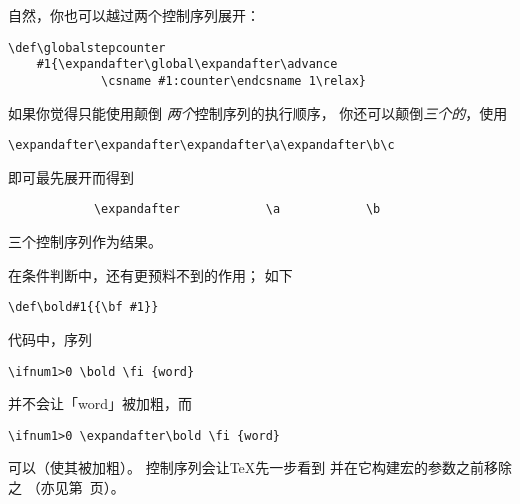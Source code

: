 \documentclass{book}
\begin{document}
自然，你也可以越过两个控制序列展开：
\begin{verbatim}
\def\globalstepcounter
    #1{\expandafter\global\expandafter\advance
             \csname #1:counter\endcsname 1\relax}
\end{verbatim}
如果你觉得只能使用颠倒
{\sl 两个\/}控制序列的执行顺序，
你还可以颠倒{\sl 三个的\/}，使用
\begin{verbatim}
\expandafter\expandafter\expandafter\a\expandafter\b\c 
\end{verbatim}
即可最先展开而得到
\begin{verbatim}
            \expandafter            \a            \b 
\end{verbatim} 
三个控制序列作为结果。

在条件判断中，还有更预料不到的作用；
如下
\begin{verbatim}
\def\bold#1{{\bf #1}}
\end{verbatim}
代码中，序列
\begin{verbatim}
\ifnum1>0 \bold \fi {word}
\end{verbatim}
并不会让「word」被加粗，而
\begin{verbatim}
\ifnum1>0 \expandafter\bold \fi {word}
\end{verbatim}
可以（使其被加粗）。
控制序列会让{\TeX}先一步看到
并在它构建宏的参数之前移除之
（亦见第~\pageref{after:cond}页）。
\end{document}
